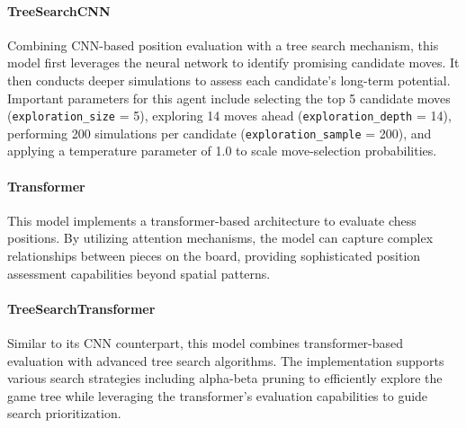 \documentclass[journal, a4paper]{IEEEtran}
\begin{document}
\paragraph{TreeSearchCNN} Combining CNN-based position evaluation with a tree search mechanism, this model first leverages the neural network to identify promising candidate moves. It then conducts deeper simulations to assess each candidate's long-term potential. Important parameters for this agent include selecting the top 5 candidate moves (\texttt{exploration\_size} = 5), exploring 14 moves ahead (\texttt{exploration\_depth} = 14), performing 200 simulations per candidate (\texttt{exploration\_sample} = 200), and applying a temperature parameter of 1.0 to scale move-selection probabilities.

\paragraph{Transformer} This model implements a transformer-based architecture to evaluate chess positions. By utilizing attention mechanisms, the model can capture complex relationships between pieces on the board, providing sophisticated position assessment capabilities beyond spatial patterns.

\paragraph{TreeSearchTransformer} Similar to its CNN counterpart, this model combines transformer-based evaluation with advanced tree search algorithms. The implementation supports various search strategies including alpha-beta pruning to efficiently explore the game tree while leveraging the transformer's evaluation capabilities to guide search prioritization.
\end{document}
